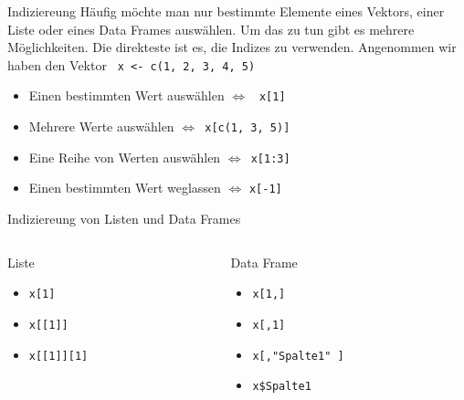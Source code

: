 \documentclass[xcolor=dvipsnames, aspectratio = 169]{beamer}
\begin{document}
\begin{frame}[fragile]{Indiziereung}
	Häufig möchte man nur bestimmte Elemente eines Vektors, einer Liste oder eines Data Frames auswählen. Um das zu tun gibt es mehrere Möglichkeiten. Die direkteste ist es, die Indizes zu verwenden. Angenommen wir haben den Vektor \verb + x <- c(1, 2, 3, 4, 5) +
	\begin{itemize}
		\item  Einen bestimmten Wert auswählen $\Leftrightarrow$ \verb+ x[1]+
		\item  Mehrere Werte auswählen $\Leftrightarrow$\verb+ x[c(1, 3, 5)]+
		\item  Eine Reihe von Werten auswählen $\Leftrightarrow$\verb+ x[1:3]+
		\item  Einen bestimmten Wert weglassen $\Leftrightarrow$ \verb+x[-1]+
	\end{itemize}
\end{frame}

\begin{frame}[fragile]{Indiziereung von Listen und Data Frames}
	
	\begin{columns}[T]
	\begin{column}{0.5\textwidth}
Liste
		\begin{itemize}
		\item \verb+x[1]+
		\item \verb+x[[1]]+
		\item \verb+x[[1]][1]+
	\end{itemize}
	\end{column}
	\begin{column}{0.5\textwidth}
Data Frame
	\begin{itemize}
		\item  \verb+x[1,]+
		\item  \verb+x[,1]+
		\item  \verb+x[,"Spalte1" ]+
		\item  \verb+x$Spalte1+
	\end{itemize}
	\end{column}
\end{columns}

\end{frame}
\end{document}
